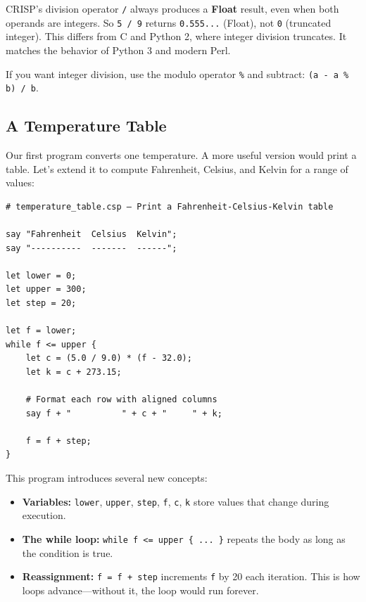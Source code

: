 \begin{tcolorbox}[colback=lightlavender, colframe=softvioletdark, title=\textbf{\textcolor{darkpurple}{Programmer's Note: Integer vs. Float Division}}, fonttitle=\bfseries, sharp corners]
CRISP's division operator \texttt{/} always produces a \textbf{Float} result, even when both operands are integers. So \texttt{5 / 9} returns \texttt{0.555...} (Float), not \texttt{0} (truncated integer). This differs from C and Python 2, where integer division truncates. It matches the behavior of Python 3 and modern Perl.

If you want integer division, use the modulo operator \texttt{\%} and subtract: \texttt{(a - a \% b) / b}.
\end{tcolorbox}

\subsection{A Temperature Table}

Our first program converts one temperature. A more useful version would print a table. Let's extend it to compute Fahrenheit, Celsius, and Kelvin for a range of values:

\begin{tcolorbox}[colback=codebg, colframe=darkpurple, colbacktitle=darkpurple, title=\textbf{\textcolor{codegold}{Temperature Table (temperature\_table.csp)}}, fonttitle=\bfseries, sharp corners]
\begin{lstlisting}
# temperature_table.csp — Print a Fahrenheit-Celsius-Kelvin table

say "Fahrenheit  Celsius  Kelvin";
say "----------  -------  ------";

let lower = 0;
let upper = 300;
let step = 20;

let f = lower;
while f <= upper {
    let c = (5.0 / 9.0) * (f - 32.0);
    let k = c + 273.15;

    # Format each row with aligned columns
    say f + "          " + c + "     " + k;

    f = f + step;
}
\end{lstlisting}
\end{tcolorbox}

This program introduces several new concepts:

\begin{itemize}
    \item \textbf{Variables:} \texttt{lower}, \texttt{upper}, \texttt{step}, \texttt{f}, \texttt{c}, \texttt{k} store values that change during execution.
    \item \textbf{The while loop:} \texttt{while f <= upper \{ ... \}} repeats the body as long as the condition is true.
    \item \textbf{Reassignment:} \texttt{f = f + step} increments \texttt{f} by 20 each iteration. This is how loops advance—without it, the loop would run forever.
\end{itemize}

